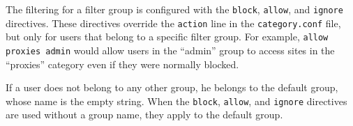 \documentclass{article}
\begin{document}
The filtering for a filter group is configured with the \verb"block", \verb"allow", and \verb"ignore"
directives. These directives override the \verb"action" line in the \verb"category.conf" file,
but only for users that belong to a specific filter group.
For example, \verb"allow proxies admin" would allow users in the ``admin'' group
to access sites in the ``proxies'' category even if they were normally blocked.

If a user does not belong to any other group, he belongs to the default group,
whose name is the empty string.
When the \verb"block", \verb"allow", and \verb"ignore" directives are used without a group name,
they apply to the default group.
\end{document}
